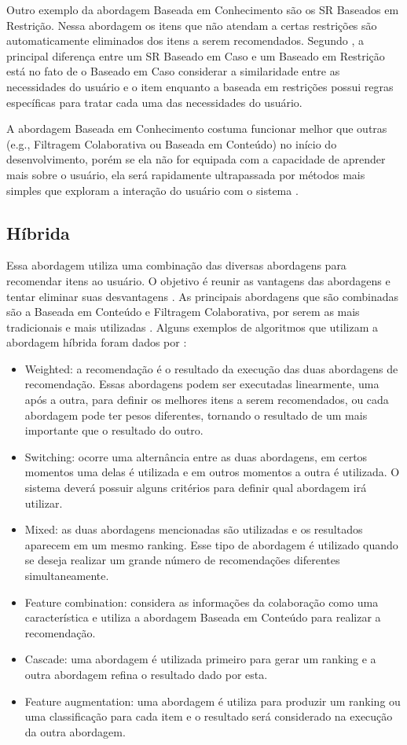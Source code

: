 Outro exemplo da abordagem Baseada em Conhecimento são os SR Baseados em Restrição. Nessa abordagem os itens que não
atendam a certas restrições são automaticamente eliminados dos itens a serem recomendados. Segundo
, a principal diferença entre um SR Baseado em Caso e um Baseado em Restrição está
no fato de o Baseado em Caso considerar a similaridade entre as necessidades do usuário e o item enquanto a baseada
em restrições possui regras específicas para tratar cada uma das necessidades do usuário.

A abordagem Baseada em Conhecimento costuma funcionar melhor que outras (e.g., Filtragem Colaborativa ou Baseada em
Conteúdo) no início do desenvolvimento, porém se ela não for equipada com a capacidade de aprender mais sobre o usuário,
ela será rapidamente ultrapassada por métodos mais simples que exploram a interação do usuário com o sistema
\cite{ricci2011introduction}.

\subsection{Híbrida}

Essa abordagem utiliza uma combinação das diversas abordagens para recomendar itens ao usuário. O objetivo é reunir as
vantagens das abordagens e tentar eliminar suas desvantagens \cite{burke2002hybrid}. As principais abordagens que são
combinadas são a Baseada em Conteúdo e Filtragem Colaborativa, por serem as mais tradicionais e mais utilizadas
\cite{adomavicius2005toward}. Alguns exemplos de algoritmos que utilizam a abordagem híbrida foram dados por
:

\begin{itemize}
\item Weighted: a recomendação é o resultado da execução das duas abordagens de recomendação. Essas abordagens podem
ser executadas linearmente, uma após a outra, para definir os melhores itens a serem recomendados, ou cada abordagem
pode ter pesos diferentes, tornando o resultado de um mais importante que o resultado do outro.
\item Switching: ocorre uma alternância entre as duas abordagens, em certos momentos uma delas é utilizada e em outros
momentos a outra é utilizada. O sistema deverá possuir alguns critérios para definir qual abordagem irá utilizar.
\item Mixed: as duas abordagens mencionadas são utilizadas e os resultados aparecem em um mesmo ranking. Esse tipo de
abordagem é utilizado quando se deseja realizar um grande número de recomendações diferentes simultaneamente.
\item Feature combination: considera as informações da colaboração como uma característica e utiliza a abordagem
Baseada em Conteúdo para realizar a recomendação.
\item Cascade: uma abordagem é utilizada primeiro para gerar um ranking e a outra abordagem refina o resultado dado
por esta.
\item Feature augmentation: uma abordagem é utiliza para produzir um ranking ou uma classificação para cada item e o
resultado será considerado na execução da outra abordagem.
\end{itemize}

